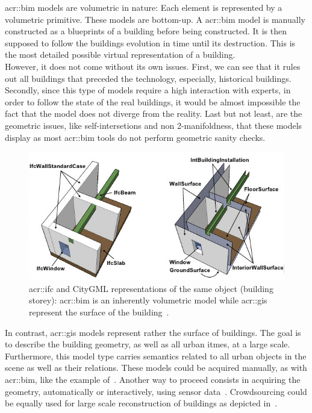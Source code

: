             \gls{acr::bim} models are volumetric in nature:
            Each element is represented by a volumetric primitive.
            These models are bottom-up.
            A \gls{acr::bim} model is manually constructed as a blueprints of a building before being constructed.
            It is then supposed to follow the buildings evolution in time until its destruction.
            This is the most detailed possible virtual representation of a building.\\
            However, it does not come without its own issues.
            First, we can see that it rules out all buildings that preceded the technology, especially, historical buildings.
            Secondly, since this type of models require a high interaction with experts, in order to follow the state of the real buildings, it would be almost impossible the fact that the model does not diverge from the reality\addref.
            Last but not least, are the geometric issues, like self-intersetions and non 2-manifoldness, that these models display as most \gls{acr::bim} tools do not perform geometric sanity checks.\\

            \begin{figure}[htpb]
                \centering
                \includegraphics[width=\textwidth]{images/bim_vs_gis}            
                \caption{
                    \label{fig::bim_vs_gis} \gls{acr::ifc} and CityGML representations of the same object (building storey): \gls{acr::bim} is an inherently volumetric model while \gls{acr::gis} represent the surface of the building~\parencite{nagel2009conceptual}.
                }
            \end{figure}

            In contrast, \gls{acr::gis} models represent rather the surface of buildings.
            The goal is to describe the building geometry, as well as all urban itmes, at a large scale.
            Furthermore, this model type carries semantics related to all urban objects in the scene as well as their relations.
            These models could be acquired manually, as with \gls{acr::bim}, like the example of~\textcite{ref3dnat}.
            Another way to proceed consists in acquiring the geometry, automatically or interactively, using sensor data~\parencite{musialski2013survey}.
            Crowdsourcing could be equally used for large scale reconstruction of buildings as depicted in~\textcite{uden2013open}.\\

